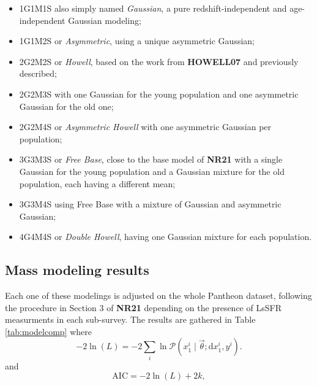 \documentclass[]{aa}
\newcommand{\prob}[2]{\mathcal{P}\left(#1 \mid #2\right)}
\begin{document}
\begin{itemize}
    \item 1G1M1S also simply named \textit{Gaussian}, a pure
        redshift-independent and age-independent Gaussian modeling;

    \item 1G1M2S or \textit{Asymmetric}, using a unique asymmetric Gaussian;

    \item 2G2M2S or \textit{Howell}, based on the work from \textbf{HOWELL07}
        and previously described;

    \item 2G2M3S with one Gaussian for the young population and one asymmetric
        Gaussian for the old one;

    \item 2G2M4S or \textit{Asymmetric Howell} with one asymmetric Gaussian per
        population;

    \item 3G3M3S or \textit{Free Base}, close to the base model of \textbf{NR21}
        with a single Gaussian for the young population and a Gaussian mixture
        for the old population, each having a different mean;

    \item 3G3M4S using Free Base with a mixture of Gaussian and asymmetric
        Gaussian;

    \item 4G4M4S or \textit{Double Howell}, having one Gaussian mixture for each
        population.
\end{itemize}

\subsection{Mass modeling results}

Each one of these modelings is adjusted on the whole Pantheon dataset,
following the procedure in Section 3 of \textbf{NR21} depending on the presence
of LsSFR measurments in each sub-survey. The results are gathered in Table
\ref{tab:modelcomp} where 
\begin{equation}\label{eq:likelihood}
    -2\ln(L) = -2 \sum_i \ln \prob{x_1^i}{\vec{\theta};
    \mathrm{d}x_1^i, y^i}.
\end{equation}
and 
\begin{equation}
    \mathrm{AIC} = -2\ln(L) + 2k,
\end{equation}
\end{document}
